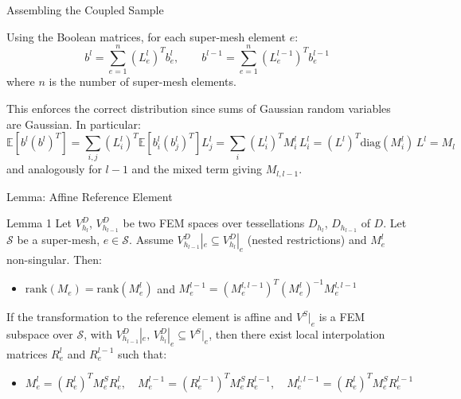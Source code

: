 \documentclass[
  english,            %
  aspectratio=169,    %
]{tumbeamer}
\begin{document}
\begin{frame}{Assembling the Coupled Sample}

Using the Boolean matrices, for each super-mesh element $e$:
\begin{equation}
  b^l = \sum_{e=1}^n (L_e^l)^T b_e^l,
  \qquad
  b^{l-1} = \sum_{e=1}^n (L_e^{l-1})^T b_e^{l-1}
\end{equation}
where $n$ is the number of super-mesh elements.

This enforces the correct distribution since sums of Gaussian random variables are Gaussian.
In particular:
\begin{equation}
  \mathbb{E}[b^l (b^l)^T]
  = \sum_{i,j} (L_i^l)^T \mathbb{E}[b_i^l (b_j^l)^T] L_j^l
  = \sum_i (L_i^l)^T M_i^l\, L_i^l
  = (L^l)^T \mathrm{diag}(M_i^l)\, L^l = M_l
\end{equation}
and analogously for $l-1$ and the mixed term giving $M_{l,l-1}$.

\end{frame}


\begin{frame}{Lemma: Affine Reference Element}

\begin{block}{Lemma 1}
Let $V_{h_l}^D$, $V_{h_{l-1}}^D$ be two FEM spaces over tessellations $D_{h_l}$,
$D_{h_{l-1}}$ of $D$. Let $\mathcal{S}$ be a super-mesh, $e \in \mathcal{S}$.
Assume $V_{h_{l-1}}^D|_e \subseteq V_{h_l}^D|_e$ (nested restrictions) and $M_e^l$
non-singular. Then:
\begin{itemize}
  \item $\mathrm{rank}(M_e) = \mathrm{rank}(M_e^l)$ and
    $M_e^{l-1} = (M_e^{l,l-1})^T (M_e^l)^{-1} M_e^{l,l-1}$
\end{itemize}
If the transformation to the reference element is affine and $V^S|_e$ is a FEM subspace
over $\mathcal{S}$, with $V_{h_{l-1}}^D|_e,\, V_{h_l}^D|_e \subseteq V^S|_e$, then there
exist local interpolation matrices $R_e^l$ and $R_e^{l-1}$ such that:
\begin{itemize}
\item \begin{equation}
  M_e^l = (R_e^l)^T M_e^S R_e^l,\quad
  M_e^{l-1} = (R_e^{l-1})^T M_e^S R_e^{l-1},\quad
  M_e^{l,l-1} = (R_e^l)^T M_e^S R_e^{l-1}
\end{equation}
\end{itemize}
\end{block}

\end{frame}
\end{document}
